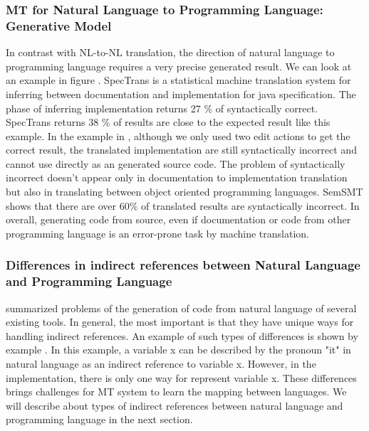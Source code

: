 \subsubsection{MT for Natural Language to Programming Language: Generative Model}
In contrast with NL-to-NL translation, the direction of natural language to programming language requires a very precise generated result. We can look at an example in figure \cite{}. SpecTrans \cite{} is a statistical machine translation system for inferring between documentation and implementation for java specification. The phase of inferring implementation returns 27 \% of syntactically correct. SpecTrans returns 38 \% of results are close to the expected result like this example. In the example in \cite{}, although we only used two edit actions to get the correct result, the translated implementation are still syntactically incorrect and cannot use directly as an generated source code. The problem of syntactically incorrect doesn't appear only in documentation to implementation translation but also in translating between object oriented programming languages. SemSMT \cite{} shows that there are over 60\% of translated results are syntactically incorrect. In overall, generating code from source, even if documentation or code from other programming language is an error-prone task by machine translation.
\subsubsection{Differences in indirect references between Natural Language and Programming Language}
\cite{} summarized problems of the generation of code from natural language of several existing tools. In general, the most important is that they have unique ways for handling indirect references. An example of such types of differences is shown by example \cite{}. In this example, a variable x can be described by the pronoun "it" in natural language as an indirect reference to variable x. However, in the implementation, there is only one way for represent variable x. These differences brings challenges for MT system to learn the mapping between languages. We will describe about types of indirect references between natural language and programming language in the next section.


